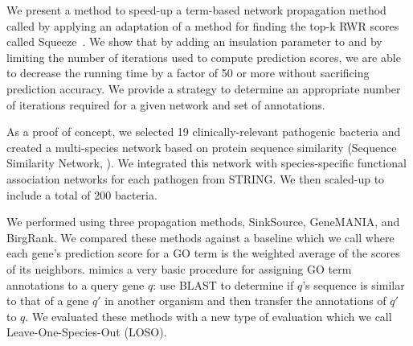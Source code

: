 We present a method to speed-up a term-based network propagation method called \sinksource by applying an adaptation of a method for finding the top-k RWR scores called Squeeze~\cite{zhang-han-ripple-fast-topk-rwr-kdd-2015}.
We show that by adding an insulation parameter to \sinksource {} and by limiting the number of iterations used to compute prediction scores, we are able to decrease the running time by a factor of 50 or more without sacrificing prediction accuracy.
We provide a strategy to determine an appropriate number of iterations required for a given network and set of annotations.

As a proof of concept, we selected 19 clinically-relevant pathogenic bacteria and created a multi-species network based on protein sequence similarity (Sequence Similarity Network, \SSN). We integrated this network with species-specific functional association networks for each pathogen from STRING. 
We then scaled-up to include a total of 200 bacteria.


We performed \pfp using three propagation methods, SinkSource, GeneMANIA, and BirgRank.
We compared these methods against a baseline which we call \localplus where each gene's prediction score for a GO term is the weighted average of the scores of its neighbors. \localplus mimics a very basic procedure for assigning GO term annotations to a query gene $q$: use BLAST to determine if $q$'s sequence  is similar to that of a gene $q'$ in another organism and then transfer the annotations of $q'$ to $q$.
%
We evaluated these methods with a new type of evaluation which we call Leave-One-Species-Out (LOSO).
